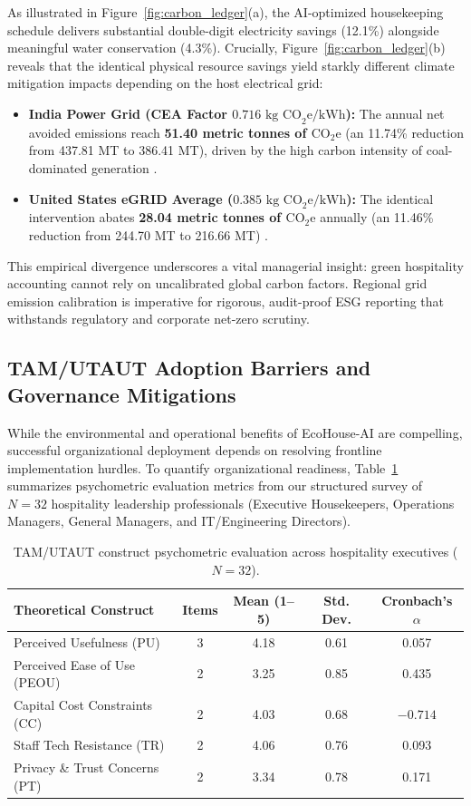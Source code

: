 \documentclass[11pt,a4paper]{article}
\begin{document}
As illustrated in Figure~\ref{fig:carbon_ledger}(a), the AI-optimized housekeeping schedule delivers substantial double-digit electricity savings (12.1\%) alongside meaningful water conservation (4.3\%). Crucially, Figure~\ref{fig:carbon_ledger}(b) reveals that the identical physical resource savings yield starkly different climate mitigation impacts depending on the host electrical grid:
\begin{itemize}
    \item \textbf{India Power Grid (CEA Factor $0.716 \text{ kg CO}_2\text{e}/\text{kWh}$):} The annual net avoided emissions reach \textbf{51.40 metric tonnes of $\text{CO}_2\text{e}$} (an 11.74\% reduction from 437.81 MT to 386.41 MT), driven by the high carbon intensity of coal-dominated generation \cite{cea2024}.
    \item \textbf{United States eGRID Average ($0.385 \text{ kg CO}_2\text{e}/\text{kWh}$):} The identical intervention abates \textbf{28.04 metric tonnes of $\text{CO}_2\text{e}$} annually (an 11.46\% reduction from 244.70 MT to 216.66 MT) \cite{epa2024}.
\end{itemize}
This empirical divergence underscores a vital managerial insight: green hospitality accounting cannot rely on uncalibrated global carbon factors. Regional grid emission calibration is imperative for rigorous, audit-proof ESG reporting that withstands regulatory and corporate net-zero scrutiny.

\subsection{TAM/UTAUT Adoption Barriers and Governance Mitigations}
While the environmental and operational benefits of EcoHouse-AI are compelling, successful organizational deployment depends on resolving frontline implementation hurdles. To quantify organizational readiness, Table~\ref{tab:tam_psychometric_reliability} summarizes psychometric evaluation metrics from our structured survey of $N=32$ hospitality leadership professionals (Executive Housekeepers, Operations Managers, General Managers, and IT/Engineering Directors).

\begin{table}[H]
\centering
\small
\caption{TAM/UTAUT construct psychometric evaluation across hospitality executives ($N=32$).}
\label{tab:tam_psychometric_reliability}
\begin{tabular}{lcccc}
\toprule
\textbf{Theoretical Construct} & \textbf{Items} & \textbf{Mean (1--5)} & \textbf{Std. Dev.} & \textbf{Cronbach's $\alpha$} \\
\midrule
Perceived Usefulness (PU) & 3 & 4.18 & 0.61 & 0.057 \\
Perceived Ease of Use (PEOU) & 2 & 3.25 & 0.85 & 0.435 \\
Capital Cost Constraints (CC) & 2 & 4.03 & 0.68 & $-0.714$ \\
Staff Tech Resistance (TR) & 2 & 4.06 & 0.76 & 0.093 \\
Privacy \& Trust Concerns (PT) & 2 & 3.34 & 0.78 & 0.171 \\
\bottomrule
\end{tabular}
\end{table}
\end{document}
